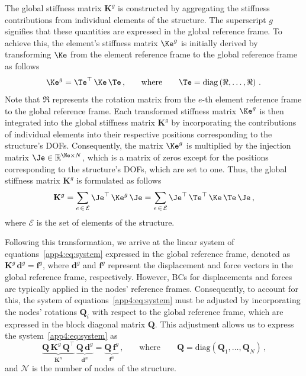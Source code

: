 The global stiffness matrix $\mathbf{K}^{g}$ is constructed by aggregating the stiffness contributions from individual elements of the structure. The superscript $g$ signifies that these quantities are expressed in the global reference frame. To achieve this, the element's stiffness matrix $\Ke^{g}$ is initially derived by transforming $\Ke$ from the element reference frame to the global reference frame as follows
%
\begin{equation*}
  \Ke^{g} = \Te^\top \, \Ke \, \Te \, \text{,} \qquad \text{where} \qquad \Te = \mathrm{diag}\left( \Re, \dots, \Re \right) \, \text{.}
\end{equation*}
%
Note that $\Re$ represents the rotation matrix from the $e$-th element reference frame to the global reference frame. Each transformed stiffness matrix $\Ke^{g}$ is then integrated into the global stiffness matrix $\mathbf{K}^{g}$ by incorporating the contributions of individual elements into their respective positions corresponding to the structure's \acp{DOF}. Consequently, the matrix $\Ke^{g}$ is multiplied by the injection matrix $\Je \in \mathbb{R}^{\Ne \times N}$, which is a matrix of zeros except for the positions corresponding to the structure's \acp{DOF}, which are set to one. Thus, the global stiffness matrix $\mathbf{K}^{g}$ is formulated as follows
%
\begin{equation*}
  \mathbf{K}^{g} = \sum_{e \, \in \, \mathcal{E}} \Je^\top \, \Ke^{g} \, \Je
   = \sum_{e \, \in \, \mathcal{E}} \Je^\top \, \Te^\top\,\Ke \, \Te \, \Je \, \text{,}
\end{equation*}
%
where $\mathcal{E}$ is the set of elements of the structure.

Following this transformation, we arrive at the linear system of equations~\eqref{app4:eq:system} expressed in the global reference frame, denoted as $\mathbf{K}^{g} \, \mathbf{d}^{g} = \mathbf{f}^{g}$, where $\mathbf{d}^{g}$ and $\mathbf{f}^{g}$ represent the displacement and force vectors in the global reference frame, respectively. However, \acp{BC} for displacements and forces are typically applied in the nodes' reference frames. Consequently, to account for this, the system of equations~\eqref{app4:eq:system} must be adjusted by incorporating the nodes' rotations $\mathbf{Q}_{i}$ with respect to the global reference frame, which are expressed in the block diagonal matrix $\mathbf{Q}$. This adjustment allows us to express the system~\eqref{app4:eq:system} as
%
\begin{equation*}
  \underbrace{\mathbf{Q} \, \mathbf{K}^{g} \, \mathbf{Q}^\top}_{\displaystyle\mathbf{K}^{n}} \, \underbrace{\mathbf{Q} \, \mathbf{d}^{g}}_{\displaystyle\mathbf{d}^{n}} = \underbrace{\mathbf{Q} \, \mathbf{f}^{g}}_{\displaystyle\mathbf{f}^{n}} \, \text{,} \qquad \text{where} \qquad \mathbf{Q} = \mathrm{diag}\left( \mathbf{Q}_{1}, \dots, \mathbf{Q}_{N} \right) \, \text{,}
\end{equation*}
%
and $\mathcal{N}$ is the number of nodes of the structure.


